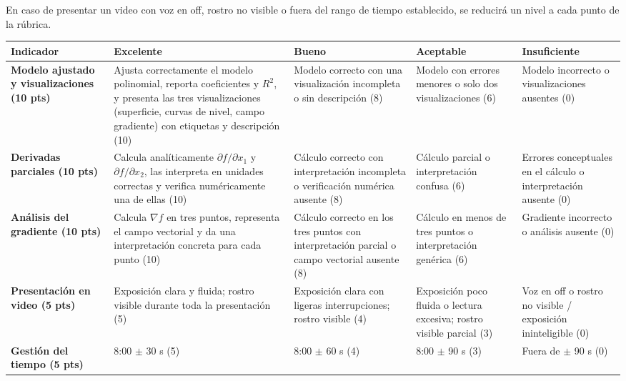 \documentclass[a4,11pt]{aleph-notas}
\begin{document}
En caso de presentar un video con voz en off, rostro no visible o fuera del rango de tiempo establecido, se reducirá un nivel a cada punto de la rúbrica.

\begin{landscape}
\begin{center}\footnotesize
\begin{tabular}{p{5cm}p{4cm}p{4cm}p{4cm}p{4cm}}
\toprule
\textbf{Indicador} & \textbf{Excelente} & \textbf{Bueno} & \textbf{Aceptable} & \textbf{Insuficiente} \\ \midrule
\textbf{Modelo ajustado y visualizaciones (10 pts)}
    & Ajusta correctamente el modelo polinomial, reporta coeficientes y $R^2$, y presenta las tres visualizaciones (superficie, curvas de nivel, campo gradiente) con etiquetas y descripción (10)
    & Modelo correcto con una visualización incompleta o sin descripción (8)
    & Modelo con errores menores o solo dos visualizaciones (6)
    & Modelo incorrecto o visualizaciones ausentes (0) \\ \midrule
\textbf{Derivadas parciales (10 pts)}
    & Calcula analíticamente $\partial f/\partial x_1$ y $\partial f/\partial x_2$, las interpreta en unidades correctas y verifica numéricamente una de ellas (10)
    & Cálculo correcto con interpretación incompleta o verificación numérica ausente (8)
    & Cálculo parcial o interpretación confusa (6)
    & Errores conceptuales en el cálculo o interpretación ausente (0) \\ \midrule
\textbf{Análisis del gradiente (10 pts)}
    & Calcula $\nabla f$ en tres puntos, representa el campo vectorial y da una interpretación concreta para cada punto (10)
    & Cálculo correcto en los tres puntos con interpretación parcial o campo vectorial ausente (8)
    & Cálculo en menos de tres puntos o interpretación genérica (6)
    & Gradiente incorrecto o análisis ausente (0) \\ \midrule
\textbf{Presentación en video (5 pts)}
    & Exposición clara y fluida; rostro visible durante toda la presentación (5)
    & Exposición clara con ligeras interrupciones; rostro visible (4)
    & Exposición poco fluida o lectura excesiva; rostro visible parcial (3)
    & Voz en off o rostro no visible / exposición ininteligible (0) \\ \midrule
\textbf{Gestión del tiempo (5 pts)}
    & 8:00 $\pm$ 30 s (5)
    & 8:00 $\pm$ 60 s (4)
    & 8:00 $\pm$ 90 s (3)
    & Fuera de $\pm$ 90 s (0) \\ \bottomrule
\end{tabular}
\end{center}
\end{landscape}
\end{document}
